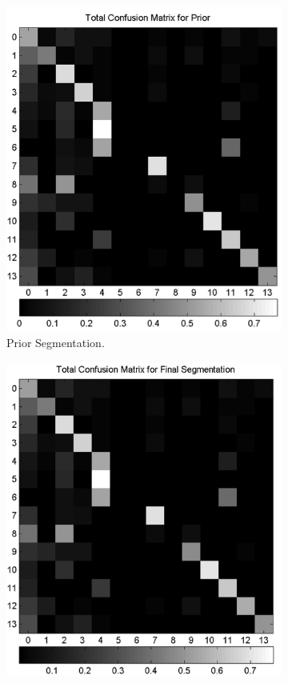 \documentclass{article} %
\begin{document}
\begin{figure}[htb]
\centering
	\begin{subfigure}[t]{0.33\textwidth}
		\centering
		\includegraphics[width = \textwidth]{./img/priorconfuse.png}
		\parbox{.95\textwidth}{\caption{Prior Segmentation. \label{fig:confuse_prior}}}
			\end{subfigure}
	\begin{subfigure}[t]{0.33\textwidth}
		\centering
		\includegraphics[width = \textwidth]{./img/finalconfuse.png}

\end{subfigure}
\end{figure}
\end{document}
